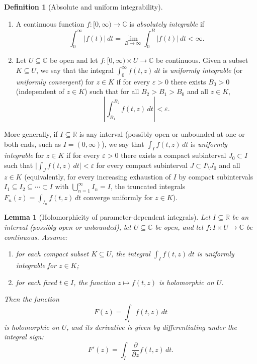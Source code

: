 \documentclass[11pt]{article}
\theoremstyle{plain}
\newtheorem{lemma}[theorem]{Lemma}
\theoremstyle{definition}
\newtheorem{definition}[theorem]{Definition}
\theoremstyle{boldremark}
\theoremstyle{remark}
\numberwithin{equation}{section}
\newcommand{\C}{\mathbb{C}}
\newcommand{\R}{\mathbb{R}}
\begin{document}
\begin{definition}[Absolute and uniform integrability]
\leavevmode
\begin{enumerate}[label=\textup{(\arabic*)}]
 \item A continuous function $f:[0,\infty)\to\C$ is \emph{absolutely
       integrable} if
       \[
        \int_0^{\infty} |f(t)|\,dt
        = \lim_{B\to\infty}\int_0^{B} |f(t)|\,dt < \infty.
       \]
 \item Let $U\subseteq\C$ be open and let $f:[0,\infty)\times U\to\C$ be
       continuous. Given a subset $K\subseteq U$, we say that the integral
       $\int_0^{\infty} f(t,z)\,dt$ is \emph{uniformly integrable} (or
       \emph{uniformly convergent}) for $z\in K$ if for every $\varepsilon>0$
       there exists $B_0>0$ (independent of $z\in K$) such that for all
       $B_2 > B_1 > B_0$ and all $z\in K$,
       \[
        \left|\int_{B_1}^{B_2} f(t,z)\,dt\right| < \varepsilon.
       \]
\end{enumerate}
More generally, if $I\subseteq\R$ is any interval (possibly open or
unbounded at one or both ends, such as $I=(0,\infty)$), we say that
$\int_I f(t,z)\,dt$ is \emph{uniformly integrable} for $z\in K$ if for
every $\varepsilon>0$ there exists a compact subinterval $J_0\subset I$
such that $\bigl|\int_J f(t,z)\,dt\bigr|<\varepsilon$ for every compact
subinterval $J\subset I\setminus J_0$ and all $z\in K$ (equivalently, for
every increasing exhaustion of $I$ by compact subintervals
$I_1\subseteq I_2\subseteq\cdots\subset I$ with $\bigcup_{n=1}^{\infty}I_n=I$,
the truncated integrals $F_n(z)=\int_{I_n} f(t,z)\,dt$ converge uniformly
for $z\in K$).
\end{definition}

\begin{lemma}[Holomorphicity of parameter-dependent integrals]\label{lem:hol-integral}
Let $I\subseteq\R$ be an interval (possibly open or unbounded), let
$U\subseteq\C$ be open, and let $f:I\times U\to\C$ be continuous. Assume:
\begin{enumerate}[label=\textup{(\roman*)}]
 \item for each compact subset $K\subseteq U$, the integral
       $\int_I f(t,z)\,dt$ is uniformly integrable for $z\in K$;
 \item for each fixed $t\in I$, the function $z\mapsto f(t,z)$ is
       holomorphic on $U$.
\end{enumerate}
Then the function
\[
 F(z) = \int_I f(t,z)\,dt
\]
is holomorphic on $U$, and its derivative is given by differentiating under
the integral sign:
\begin{equation}\label{eq:diff-under-int}
 F'(z) = \int_I \frac{\partial}{\partial z} f(t,z)\,dt.
\end{equation}
\end{lemma}
\end{document}

